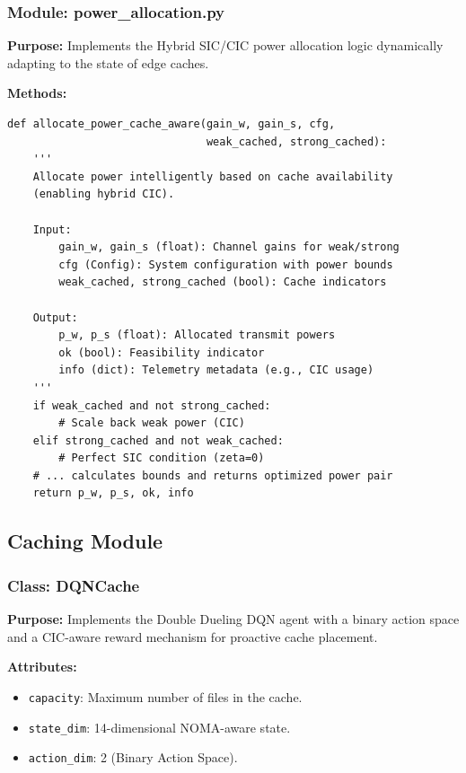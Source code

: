 \documentclass[12pt,a4paper]{article}
\begin{document}
\subsubsection{Module: power\_allocation.py}

\textbf{Purpose:} Implements the Hybrid SIC/CIC power allocation logic dynamically adapting to the state of edge caches.

\textbf{Methods:}
\begin{verbatim}
def allocate_power_cache_aware(gain_w, gain_s, cfg, 
                               weak_cached, strong_cached):
    '''
    Allocate power intelligently based on cache availability 
    (enabling hybrid CIC).
    
    Input:
        gain_w, gain_s (float): Channel gains for weak/strong
        cfg (Config): System configuration with power bounds
        weak_cached, strong_cached (bool): Cache indicators
        
    Output:
        p_w, p_s (float): Allocated transmit powers
        ok (bool): Feasibility indicator
        info (dict): Telemetry metadata (e.g., CIC usage)
    '''
    if weak_cached and not strong_cached:
        # Scale back weak power (CIC)
    elif strong_cached and not weak_cached:
        # Perfect SIC condition (zeta=0)
    # ... calculates bounds and returns optimized power pair
    return p_w, p_s, ok, info
\end{verbatim}

\subsection{Caching Module}

\subsubsection{Class: DQNCache}

\textbf{Purpose:} Implements the Double Dueling DQN agent with a binary action space and a CIC-aware reward mechanism for proactive cache placement.

\textbf{Attributes:}
\begin{itemize}
    \item \texttt{capacity}: Maximum number of files in the cache.
    \item \texttt{state\_dim}: 14-dimensional NOMA-aware state.
    \item \texttt{action\_dim}: 2 (Binary Action Space).
\end{itemize}
\end{document}
